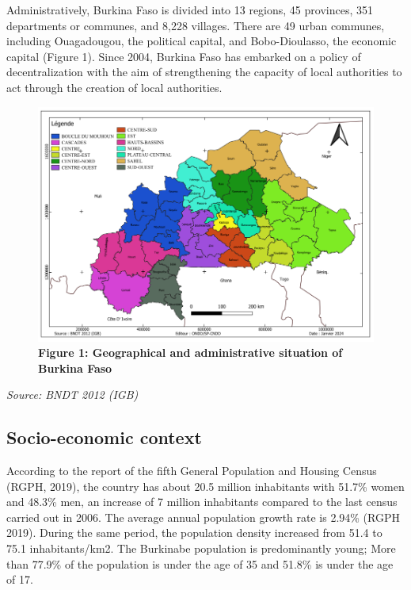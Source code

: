 \documentclass[
]{book}
\begin{document}
Administratively, Burkina Faso is divided into 13 regions, 45 provinces, 351 departments or communes, and 8,228 villages. There are 49 urban communes, including Ouagadougou, the political capital, and Bobo-Dioulasso, the economic capital (Figure 1). Since 2004, Burkina Faso has embarked on a policy of decentralization with the aim of strengthening the capacity of local authorities to act through the creation of local authorities.

\begin{figure}
\centering
\includegraphics{Figures and Photos/Figure 1.png}
\caption{\textbf{Figure 1: Geographical and administrative situation of Burkina Faso}}
\end{figure}

\emph{Source: BNDT 2012 (IGB)}

\subsection{Socio-economic context}\label{socio-economic-context}

According to the report of the fifth General Population and Housing Census (RGPH, 2019), the country has about 20.5 million inhabitants with 51.7\% women and 48.3\% men, an increase of 7 million inhabitants compared to the last census carried out in 2006. The average annual population growth rate is 2.94\% (RGPH 2019). During the same period, the population density increased from 51.4 to 75.1 inhabitants/km2. The Burkinabe population is predominantly young; More than 77.9\% of the population is under the age of 35 and 51.8\% is under the age of 17.
\end{document}
